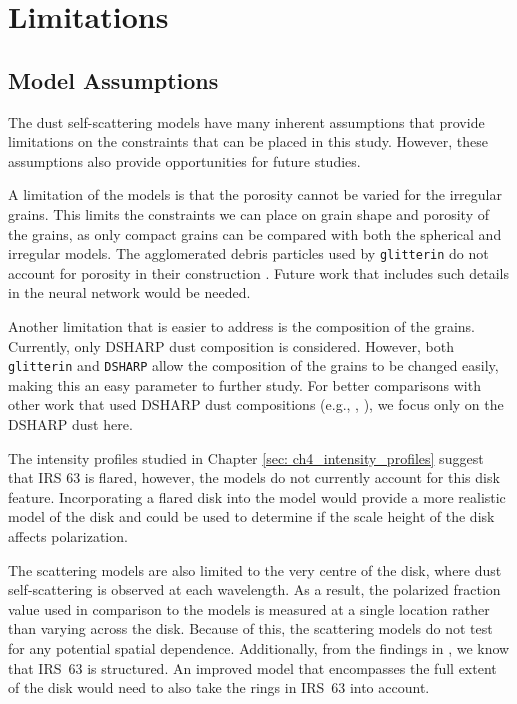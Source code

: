 \section{Limitations}
\subsection{Model Assumptions}

The dust self-scattering models have many inherent assumptions that provide limitations on the constraints that can be placed in this study. However, these assumptions also provide opportunities for future studies. 


A limitation of the models is that the porosity cannot be varied for the irregular grains. This limits the constraints we can place on grain shape and porosity of the grains, as only compact grains can be compared with both the spherical and irregular models. The agglomerated debris particles used by \texttt{glitterin} do not account for porosity in their construction \citep{glitterin}.  Future work that includes such details in the neural network would be needed.


Another limitation that is easier to address is the composition of the grains. Currently, only DSHARP dust composition is considered. However, both \texttt{glitterin} and \texttt{DSHARP} allow the composition of the grains to be changed easily, making this an easy parameter to further study. For better comparisons with other work that used DSHARP dust compositions (e.g., \cite{Mori}, \cite{Ueda}), we focus only on the DSHARP dust here.








The intensity profiles studied in Chapter \ref{sec: ch4_intensity_profiles} suggest that IRS 63 is flared, however, the models do not currently account for this disk feature. Incorporating a flared disk into the model would provide a more realistic model of the disk and could be used to determine if the scale height of the disk affects polarization.  




The scattering models are also limited to the very centre of the disk, where dust self-scattering is observed at each wavelength. As a result, the polarized fraction value used in comparison to the models is measured at a single location rather than varying across the disk. Because of this, the scattering models do not test for any potential spatial dependence. Additionally, from the findings in \cite{Dom2020}, we know that IRS~63 is structured. An improved model that encompasses the full extent of the disk would need to also take the rings in IRS~63 into account. 



